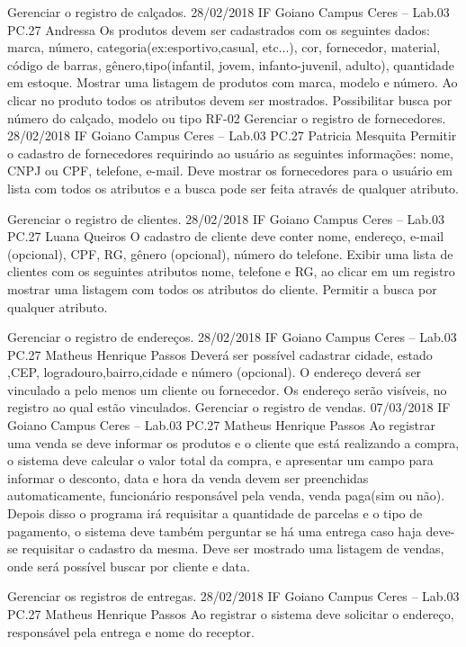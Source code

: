 \begin{center}
	   {Gerenciar o registro de calçados.}
	   {28/02/2018}
	   {IF Goiano Campus Ceres – Lab.03 PC.27}
	   {Andressa}
	   {Os produtos devem ser cadastrados com os seguintes dados: marca, número, categoria(ex:esportivo,casual, etc...), cor, fornecedor, material, código de barras, gênero,tipo(infantil, jovem, infanto-juvenil, adulto), quantidade em estoque. Mostrar uma listagem de produtos com marca, modelo e número. Ao clicar no produto todos os atributos devem ser mostrados. Possibilitar busca por número do calçado, modelo ou tipo}
	 \addrequisito
	   	{RF-02}
	    {Gerenciar o registro de fornecedores.}
	    {28/02/2018}
	    {IF Goiano Campus Ceres – Lab.03 PC.27}
	    {Patricia Mesquita}
	    {Permitir o cadastro de fornecedores requirindo ao usuário as seguintes informações: nome, CNPJ ou CPF, telefone, e-mail. Deve mostrar os fornecedores para o usuário em lista com todos os atributos e a busca pode ser feita através de qualquer atributo.}
		
	    {Gerenciar o registro de clientes.}
	    {28/02/2018}
	    {IF Goiano Campus Ceres – Lab.03 PC.27}
	   	{Luana Queiros}
	    {O cadastro de cliente deve conter nome, endereço, e-mail (opcional), CPF, RG, gênero (opcional), número do telefone. Exibir uma lista de clientes com os seguintes atributos nome, telefone e RG, ao clicar em um registro mostrar uma listagem com todos os atributos do cliente. Permitir a busca por qualquer atributo.}
	    
		{Gerenciar o registro de endereços.}
		{28/02/2018}
		{IF Goiano Campus Ceres – Lab.03 PC.27}
		{Matheus Henrique Passos}    
		{Deverá ser possível cadastrar cidade, estado ,CEP, logradouro,bairro,cidade e número (opcional). O endereço deverá ser vinculado a pelo menos um cliente ou fornecedor. Os endereço serão visíveis, no registro ao qual estão vinculados.}  
		{Gerenciar o registro de vendas.}
		{07/03/2018}
		{IF Goiano Campus Ceres – Lab.03 PC.27}
		{Matheus Henrique Passos}
		{Ao registrar uma venda se deve informar os produtos e o cliente que está realizando a compra, o sistema deve calcular o valor total da compra, e apresentar um campo para informar o desconto, data e hora da venda devem ser preenchidas automaticamente, funcionário responsável pela venda, venda paga(sim ou não). Depois disso o programa irá requisitar a quantidade de parcelas e o tipo de pagamento, o sistema deve também perguntar se há uma entrega caso haja deve-se requisitar o cadastro da mesma. Deve ser mostrado uma listagem de vendas, onde será possível buscar por cliente e data.}
		
		{Gerenciar os registros de entregas.}
		{28/02/2018}
		{IF Goiano Campus Ceres – Lab.03 PC.27}
		{Matheus Henrique Passos}
		{Ao registrar o sistema deve solicitar o endereço, responsável pela entrega e nome do receptor.}

\end{center}
